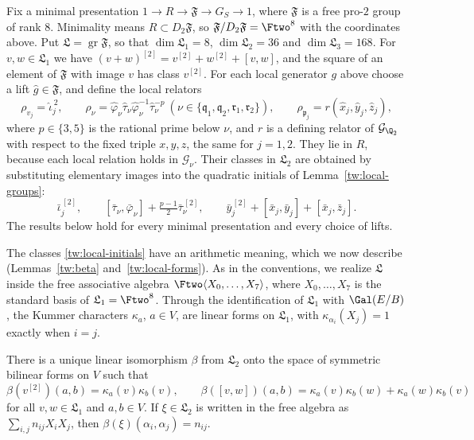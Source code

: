 Fix a minimal presentation $1\to R\to\mathfrak F\to G_S\to1$, where
$\mathfrak F$ is a free pro-$2$ group of rank $8$. Minimality means
$R\subset D_2\mathfrak F$, so $\mathfrak F/D_2\mathfrak F=\Ftwo^8$ with the
coordinates above. Put $\mathfrak L=\operatorname{gr}\mathfrak F$, so that
$\dim\mathfrak L_1=8$, $\dim\mathfrak L_2=36$ and $\dim\mathfrak L_3=168$.
For $v,w\in\mathfrak L_1$ we have $(v+w)^{[2]}=v^{[2]}+w^{[2]}+[v,w]$, and the
square of an element of $\mathfrak F$ with image $v$ has class $v^{[2]}$. For
each local generator $g$ above choose a lift $\hat g\in\mathfrak F$, and define
the local relators
\begin{equation}\label{tw:relators}
 \rho_{v_j}=\hat\iota_j^{\,2},\qquad
 \rho_\nu=\hat\varphi_\nu\hat\tau_\nu\hat\varphi_\nu^{-1}\hat\tau_\nu^{-p}
 \ (\nu\in\{\mathfrak q_1,\mathfrak q_2,\mathfrak r_1,\mathfrak r_2\}),\qquad
 \rho_{\mathfrak p_j}=r(\hat x_j,\hat y_j,\hat z_j),
\end{equation}
where $p\in\{3,5\}$ is the rational prime below $\nu$, and $r$ is a
defining relator of $\mathcal G_{\Q_2}$ with respect to the fixed triple
$x,y,z$, the same for $j=1,2$. They lie in $R$, because each local relation
holds in $\mathcal G_\nu$. Their classes in $\mathfrak L_2$ are obtained by
substituting elementary images into the quadratic initials of
Lemma~\ref{tw:local-groups}:
\begin{equation}\label{tw:local-initials}
 \bar\iota_j^{\,[2]},\qquad
 [\bar\tau_\nu,\bar\varphi_\nu]+\tfrac{p-1}2\bar\tau_\nu^{\,[2]},\qquad
 \bar y_j^{\,[2]}+[\bar x_j,\bar y_j]+[\bar x_j,\bar z_j].
\end{equation}
The results below hold for every minimal presentation and every choice of
lifts.

The classes \eqref{tw:local-initials} have an arithmetic meaning, which we
now describe (Lemmas~\ref{tw:beta} and~\ref{tw:local-forms}). As in the
conventions, we realize $\mathfrak L$ inside the free associative algebra
$\Ftwo\langle X_0,\dots,X_7\rangle$, where $X_0,\dots,X_7$ is the standard
basis of $\mathfrak L_1=\Ftwo^8$. Through the identification of $\mathfrak L_1$
with $\Gal(E/B)$, the Kummer characters $\kappa_a$, $a\in V$, are linear forms
on $\mathfrak L_1$, with $\kappa_{\alpha_i}(X_j)=1$ exactly when $i=j$.

\begin{lemma}\label{tw:beta}
There is a unique linear isomorphism $\beta$ from $\mathfrak L_2$ onto the
space of symmetric bilinear forms on $V$ such that
\[
 \beta(v^{[2]})(a,b)=\kappa_a(v)\kappa_b(v),\qquad
 \beta([v,w])(a,b)=\kappa_a(v)\kappa_b(w)+\kappa_a(w)\kappa_b(v)
\]
for all $v,w\in\mathfrak L_1$ and $a,b\in V$. If $\xi\in\mathfrak L_2$ is
written in the free algebra as $\sum_{i,j}n_{ij}X_iX_j$, then
$\beta(\xi)(\alpha_i,\alpha_j)=n_{ij}$.
\end{lemma}

